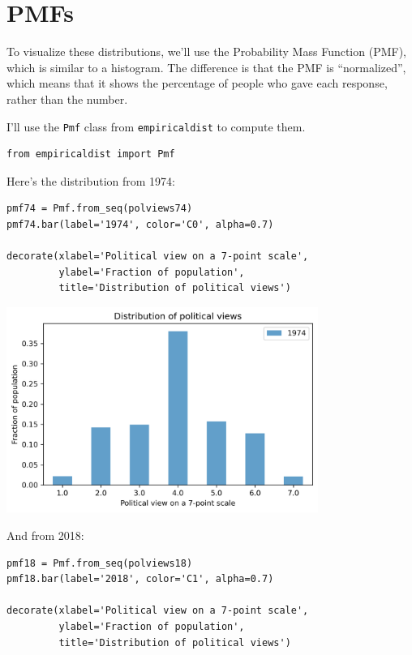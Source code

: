 \hypertarget{pmfs}{%
\section{PMFs}\label{pmfs}}

To visualize these distributions, we'll use the Probability Mass
Function (PMF), which is similar to a histogram. The difference is that
the PMF is ``normalized'', which means that it shows the percentage of
people who gave each response, rather than the number.

I'll use the \passthrough{\lstinline!Pmf!} class from
\passthrough{\lstinline!empiricaldist!} to compute them.

\begin{lstlisting}[]
from empiricaldist import Pmf
\end{lstlisting}

Here's the distribution from 1974:

\begin{lstlisting}[]
pmf74 = Pmf.from_seq(polviews74)
pmf74.bar(label='1974', color='C0', alpha=0.7)

decorate(xlabel='Political view on a 7-point scale',
         ylabel='Fraction of population',
         title='Distribution of political views')
\end{lstlisting}

\begin{center}
\includegraphics[width=4in]{chapters/02_polviews_files/02_polviews_30_0.png}
\end{center}

And from 2018:

\begin{lstlisting}[]
pmf18 = Pmf.from_seq(polviews18)
pmf18.bar(label='2018', color='C1', alpha=0.7)

decorate(xlabel='Political view on a 7-point scale',
         ylabel='Fraction of population',
         title='Distribution of political views')
\end{lstlisting}

